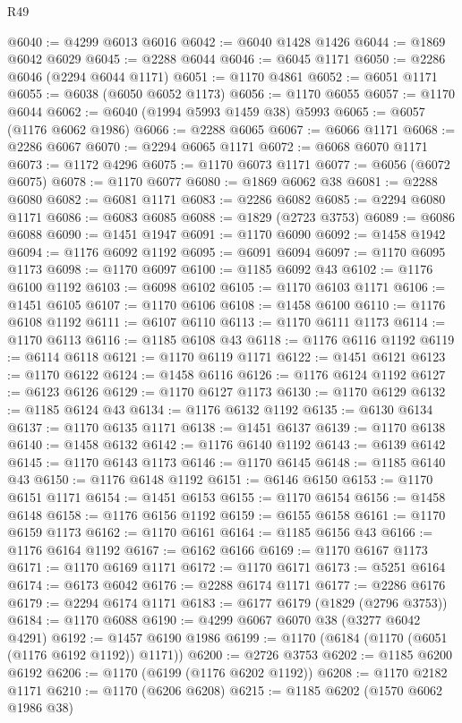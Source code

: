 \begin{lexlean}{R49}
\begin{coremodule}
@6040 := @4299 @6013 @6016
@6042 := @6040 @1428 @1426
@6044 := @1869 @6042 @6029
@6045 := @2288 @6044
@6046 := @6045 @1171
@6050 := @2286 @6046 (@2294 @6044 @1171)
@6051 := @1170 @4861
@6052 := @6051 @1171
@6055 := @6038 (@6050 @6052 @1173)
@6056 := @1170 @6055
@6057 := @1170 @6044
@6062 := @6040 (@1994 @5993 @1459 @38) @5993
@6065 := @6057 (@1176 @6062 @1986)
@6066 := @2288 @6065
@6067 := @6066 @1171
@6068 := @2286 @6067
@6070 := @2294 @6065 @1171
@6072 := @6068 @6070 @1171
@6073 := @1172 @4296
@6075 := @1170 @6073 @1171
@6077 := @6056 (@6072 @6075)
@6078 := @1170 @6077
@6080 := @1869 @6062 @38
@6081 := @2288 @6080
@6082 := @6081 @1171
@6083 := @2286 @6082
@6085 := @2294 @6080 @1171
@6086 := @6083 @6085
@6088 := @1829 (@2723 @3753)
@6089 := @6086 @6088
@6090 := @1451 @1947
@6091 := @1170 @6090
@6092 := @1458 @1942
@6094 := @1176 @6092 @1192
@6095 := @6091 @6094
@6097 := @1170 @6095 @1173
@6098 := @1170 @6097
@6100 := @1185 @6092 @43
@6102 := @1176 @6100 @1192
@6103 := @6098 @6102
@6105 := @1170 @6103 @1171
@6106 := @1451 @6105
@6107 := @1170 @6106
@6108 := @1458 @6100
@6110 := @1176 @6108 @1192
@6111 := @6107 @6110
@6113 := @1170 @6111 @1173
@6114 := @1170 @6113
@6116 := @1185 @6108 @43
@6118 := @1176 @6116 @1192
@6119 := @6114 @6118
@6121 := @1170 @6119 @1171
@6122 := @1451 @6121
@6123 := @1170 @6122
@6124 := @1458 @6116
@6126 := @1176 @6124 @1192
@6127 := @6123 @6126
@6129 := @1170 @6127 @1173
@6130 := @1170 @6129
@6132 := @1185 @6124 @43
@6134 := @1176 @6132 @1192
@6135 := @6130 @6134
@6137 := @1170 @6135 @1171
@6138 := @1451 @6137
@6139 := @1170 @6138
@6140 := @1458 @6132
@6142 := @1176 @6140 @1192
@6143 := @6139 @6142
@6145 := @1170 @6143 @1173
@6146 := @1170 @6145
@6148 := @1185 @6140 @43
@6150 := @1176 @6148 @1192
@6151 := @6146 @6150
@6153 := @1170 @6151 @1171
@6154 := @1451 @6153
@6155 := @1170 @6154
@6156 := @1458 @6148
@6158 := @1176 @6156 @1192
@6159 := @6155 @6158
@6161 := @1170 @6159 @1173
@6162 := @1170 @6161
@6164 := @1185 @6156 @43
@6166 := @1176 @6164 @1192
@6167 := @6162 @6166
@6169 := @1170 @6167 @1173
@6171 := @1170 @6169 @1171
@6172 := @1170 @6171
@6173 := @5251 @6164
@6174 := @6173 @6042
@6176 := @2288 @6174 @1171
@6177 := @2286 @6176
@6179 := @2294 @6174 @1171
@6183 := @6177 @6179 (@1829 (@2796 @3753))
@6184 := @1170 @6088
@6190 := @4299 @6067 @6070 @38 (@3277 @6042 @4291)
@6192 := @1457 @6190 @1986
@6199 := @1170 (@6184 (@1170 (@6051 (@1176 @6192 @1192)) @1171))
@6200 := @2726 @3753
@6202 := @1185 @6200 @6192
@6206 := @1170 (@6199 (@1176 @6202 @1192))
@6208 := @1170 @2182 @1171
@6210 := @1170 (@6206 @6208)
@6215 := @1185 @6202 (@1570 @6062 @1986 @38)

\end{coremodule}
\end{lexlean}
